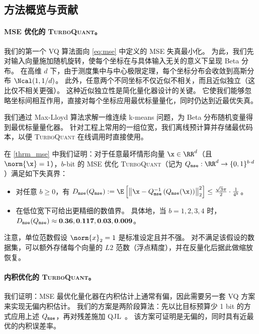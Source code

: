 \documentclass[11pt]{ctexart}
\newcommand{\TurboQuant}{\textsc{TurboQuant}\xspace}
\let\cref\ref
\begin{document}



\subsection{方法概览与贡献}

\paragraph{MSE 优化的 \TurboQuant。}
我们的第一个 VQ 算法面向 \cref{eq:mse} 中定义的 MSE 失真最小化。
为此，我们先对输入向量施加随机旋转，使每个坐标在与具体输入无关的意义下呈现 Beta 分布。
在高维 $d$ 下，由于测度集中与中心极限定理，每个坐标分布会收敛到高斯分布 $\Ncal(1, 1/d)$。 
此外，任意两个不同坐标不仅近似不相关，而且近似独立（这比仅不相关更强）。
这种近似独立性是简化量化器设计的关键。
它使我们能够忽略坐标间相互作用，直接对每个坐标应用最优标量量化，同时仍达到近最优失真。

我们通过 Max-Lloyd 算法求解一维连续 k-means 问题，为 Beta 分布随机变量得到最优标量量化器。 
针对工程上常用的一组位宽，我们离线预计算并存储最优码本，以便 \TurboQuant 在线调用时直接使用。

在 \cref{thrm_mse} 中我们证明：对于任意最坏情形向量 $\x \in \RR^d$（且 $\norm{\x}=1$），$b$-bit 的 MSE 优化 \TurboQuant（记为 $Q_{\tt mse}: \RR^d \to \{ 0, 1 \}^{b \cdot d}$）满足如下失真界：
\begin{itemize}
    \item 对任意 $b \ge 0$，有
    $D_{\tt mse}(Q_{\tt mse}) := \E\left[\left\| \x - Q_{\tt mse}^{-1}\left( Q_{\tt mse}(\x) \right) \right\|_2^2 \right] \le \frac{\sqrt{3} \pi}{2} \cdot \frac{1}{4^{b}}$。
    \item 在低位宽下可给出更精细的数值界。
    具体地，当 $b = 1, 2, 3, 4$ 时，$D_{\tt mse}(Q_{\tt mse}) \approx {\bf 0.36}, {\bf 0.117}, {\bf 0.03}, {\bf 0.009}$。
\end{itemize}

注意，单位范数假设 $\norm{x}_2=1$ 是标准设定且并不强。
对不满足该假设的数据集，可以额外存储每个向量的 $L2$ 范数（浮点精度），并在反量化后据此做缩放恢复。

\paragraph{内积优化的 \TurboQuant。}
我们证明：MSE 最优化量化器在内积估计上通常有偏，因此需要另一套 VQ 方案来实现无偏内积估计。
我们的方案是两阶段算法：先以比目标预算少 1 bit 的方式应用上述 $Q_{\tt mse}$，再对残差施加 QJL~\cite{qjl}。
该方案可证明是无偏的，同时具有近最优的内积误差率。
\end{document}

